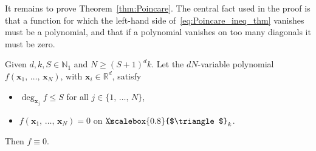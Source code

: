 \documentclass[AHL, Unicode, longabstracts, published]{cedram}
\newcommand*\N {\mathbb{N}}
\newcommand*\R {\mathbb{R}}
\newcommand\1{{\ensuremath {\mathds 1} }}
\newcommand{\bx}{\mathbf{x}}
\newcommand{\bDelta}{{\mbox{$\triangle$}\hspace{-8.6pt}\scalebox{0.8}{$\triangle$}}}
\begin{document}
It remains to prove Theorem~\ref{thm:Poincare}. The central fact used in the proof is that a function for which the left-hand side of~\eqref{eq:Poincare_ineq_thm} vanishes must be a polynomial, and that if a polynomial vanishes on too many diagonals it must be zero.

\begin{lemm}\label{lem:Polynomial_vanishing}
Given $d,k,S\in \N_1$ and $N \ge (S+1)^d k$. Let the $dN$-variable polynomial $f(\bx_1,\,\ldots,\,\bx_N)$, with $\bx_i\in \R^d$, satisfy
\begin{itemize}
\item $\deg_{\bx_j} f\le S$ for all $j \in \{1,\,\ldots,\,N\}$,
\item $f(\bx_1,\,\ldots,\,\bx_N)=0$ on $\bDelta_k$.
\end{itemize}
Then $f\equiv 0$.
\end{lemm}
\end{document}

